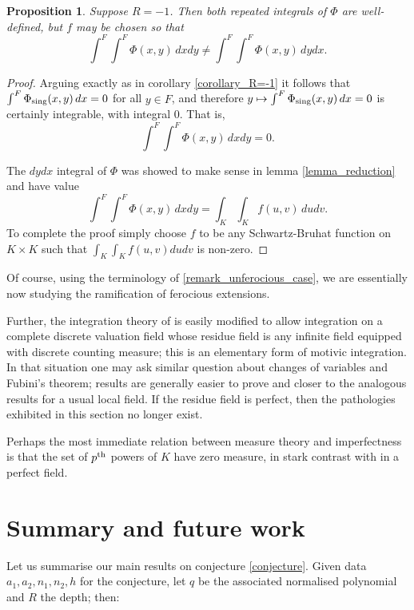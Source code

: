 \documentclass{lmsMODIFIED}
\newtheorem{proposition}[theorem]{Proposition}
\newcommand{\sub}[1]{{\mbox{\scriptsize {#1}}}}
\begin{document}
\begin{proposition}\label{proposition_R=-1_purely_insep}
Suppose $R=-1$. Then both repeated integrals of $\Phi$ are well-defined, but $f$ may be chosen so that \[\int^F\int^F\Phi(x,y)\,dxdy\neq\int^F\int^F\Phi(x,y)\,dydx.\]
\end{proposition}
\begin{proof}
Arguing exactly as in corollary \ref{corollary_R=-1} it follows that $\int^F\Phi_\sub{sing}(x,y)\,dx=0$ for all $y\in F$, and therefore $y\mapsto \int^F\Phi_\sub{sing}(x,y)\,dx=0$ is certainly integrable, with integral $0$. That is, \[\int^F\int^F\Phi(x,y)\,dxdy=0.\]

The $dydx$ integral of $\Phi$ was showed to make sense in lemma \ref{lemma_reduction} and have value \[\int^F\int^F\Phi(x,y)\,dxdy=\int_K\int_K f(u,v)\,dudv.\] To complete the proof simply choose $f$ to be any Schwartz-Bruhat function on $K\times K$ such that $\int_K\int_K f(u,v)dudv$ is non-zero.
\end{proof}

\begin{remark}
Of course, using the terminology of \ref{remark_unferocious_case}, we are essentially now studying the ramification of ferocious extensions.

Further, the integration theory of \cite{Morrow2008} is easily modified to allow integration on a complete discrete valuation field whose residue field is any infinite field equipped with discrete counting measure; this is an elementary form of motivic integration. In that situation one may ask similar question about changes of variables and Fubini's theorem; results are generally easier to prove and closer to the analogous results for a usual local field. If the residue field is perfect, then the pathologies exhibited in this section no longer exist.

Perhaps the most immediate relation between measure theory and imperfectness is that the set of $p^\sub{th}$ powers of $K$ have zero measure, in stark contrast with in a perfect field.
\end{remark}

\section{Summary and future work}\label{section_summary}

Let us summarise our main results on conjecture \ref{conjecture}. Given data $a_1,a_2,n_1,n_2,h$ for the conjecture, let $q$ be the associated normalised polynomial and $R$ the depth; then:
\end{document}
